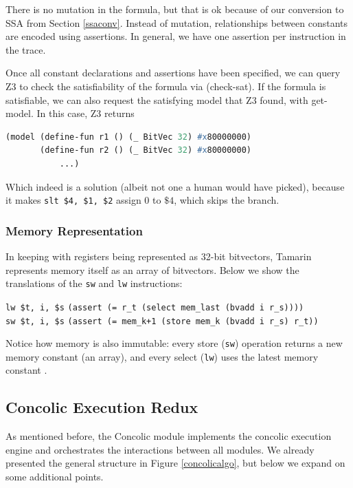 \documentclass{llncs}
\begin{document}
There is no mutation in the formula, but that is ok because of our conversion to SSA from Section \ref{ssaconv}. Instead of mutation, relationships between constants are encoded using assertions. In general, we have one assertion per instruction in the trace.

Once all constant declarations and assertions have been specified, we can query Z3 to check the satisfiability of the formula via \textsf{(check-sat)}. If the formula is satisfiable, we can also request the satisfying model that Z3 found, with \textsf{get-model}. In this case, Z3 returns 

\begin{lstlisting}[language=Lisp]
(model (define-fun r1 () (_ BitVec 32) #x80000000)
       (define-fun r2 () (_ BitVec 32) #x80000000)
           ...)
\end{lstlisting}

Which indeed is a solution (albeit not one a human would have picked), because it makes \lstinline{slt $4, $1, $2} assign $0$ to $\$4$, which skips the branch.

\subsubsection{Memory Representation} 

In keeping with registers being represented as 32-bit bitvectors, Tamarin represents memory itself as an array of bitvectors. Below we show the translations of the \lstinline{sw} and \lstinline{lw} instructions:

\noindent \lstinline{lw $t, i, $s} \hspace{2cm} \lstinline{(assert (= r_t (select mem_last (bvadd i r_s))))} \\
\lstinline{sw $t, i, $s} \hspace{2cm} \lstinline{(assert (= mem_k+1 (store mem_k (bvadd i r_s) r_t))}

Notice how memory is also immutable: every \textsf{store} (\lstinline{sw}) operation returns a new memory constant (an array), and every \textsf{select} (\lstinline{lw}) uses the latest memory constant .

\subsection{Concolic Execution Redux}
\label{redux}

As mentioned before, the \textsf{Concolic} module implements the concolic execution engine and orchestrates the interactions between all modules.
We already presented the general structure in Figure \ref{concolicalgo}, but below we expand on some additional points.
\end{document}

